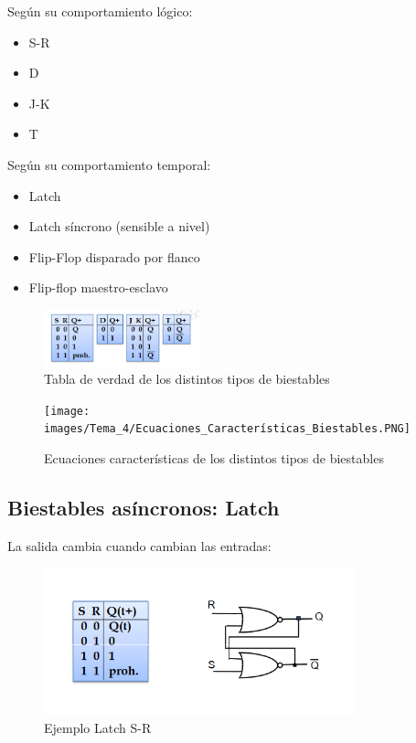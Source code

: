 \begin{multicols}{2}
	Según su comportamiento lógico:
	\begin{itemize}
		\item S-R
		\item D
		\item J-K
		\item T
	\end{itemize}
	\vfill
	\null
	Según su comportamiento temporal:
	\begin{itemize}
		\item Latch
		\item Latch síncrono (sensible a nivel)
		\item Flip-Flop disparado por flanco
		\item Flip-flop maestro-esclavo
	\end{itemize}
\end{multicols}
\begin{multicols}{2}
	\begin{figure}[H]
		\centering
		\includegraphics[width = 0.4\textwidth]{images/Tema_4/Tabla_Verdad_Biiestables.PNG}
		\caption{Tabla de verdad de los distintos tipos de biestables}
	\end{figure}
	\vfill
	\null
	\begin{figure}[H]
		\centering
		\texttt{[image: images/Tema\_4/Ecuaciones\_Características\_Biestables.PNG]}
		\caption{Ecuaciones características de los distintos tipos de biestables}
	\end{figure}
\end{multicols}
\newpage
\subsection{Biestables asíncronos: Latch}
La salida cambia cuando cambian las entradas:
\begin{figure}[H]
	\centering
	\includegraphics[width=0.8\textwidth]{images/Tema_4/Ejemplo_Latch.PNG}
	\caption{Ejemplo Latch S-R}
\end{figure}
